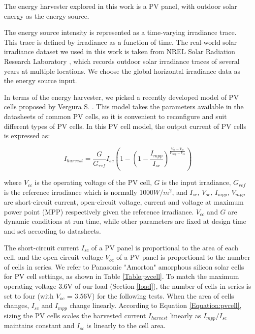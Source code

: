 The energy harvester explored in this work is a PV panel, with outdoor solar energy as the energy source. 

The energy source intensity is represented as a time-varying irradiance trace. This trace is defined by irradiance as a function of time. The real-world solar irradiance dataset we used in this work is taken from NREL Solar Radiation Research Laboratory \cite{stoffel1981nrel}, which records outdoor solar irradiance traces of several years at multiple locations. We choose the global horizontal irradiance data as the energy source input.

In terms of the energy harvester, we picked a recently developed model of PV cells proposed by Vergura S. \cite{en9050326}. This model takes the parameters available in the datasheets of common PV cells, so it is convenient to reconfigure and suit different types of PV cells. In this PV cell model, the output current of PV cells is expressed as: 

\begin{equation} \label{Equation:pvcell}
    I_{harvest} = \frac{G}{G_{ref}} I_{sc} (1 - (1 - \frac{I_{mpp}}{I_{sc}}) ^ {\frac{V_{cc}-V_{oc}}{V_{mpp} - V_{oc}}})
\end{equation}

where $V_{cc}$ is the operating voltage of the PV cell, $G$ is the input irradiance, $G_{ref}$ is the reference irradiance which is normally 1000$W/m^2$, and $I_{sc}$, $V_{oc}$, $I_{mpp}$, $V_{mpp}$ are short-circuit current, open-circuit voltage, current and voltage at maximum power point (MPP) respectively given the reference irradiance. $V_{cc}$ and $G$ are dynamic conditions at run time, while other parameters are fixed at design time and set according to datasheets. 

The short-circuit current $I_{sc}$ of a PV panel is proportional to the area of each cell, and the open-circuit voltage $V_{oc}$ of a PV panel is proportional to the number of cells in series. We refer to Panasonic "Amorton" amorphous silicon solar cells \cite{solarcell} for PV cell settings, as shown in Table \ref{Table:pvcell}. To match the maximum operating voltage 3.6V of our load (Section \ref{load}), the number of cells in series is set to four (with $V_{oc}$ = 3.56V) for the following tests. When the area of cells changes, $I_{sc}$ and $I_{mpp}$ change linearly. According to Equation \ref{Equation:pvcell}, sizing the PV cells scales the harvested current $I_{harvest}$ linearly as $I_{mpp} / I_{sc}$ maintains constant and $I_{sc}$ is linearly to the cell area. 

